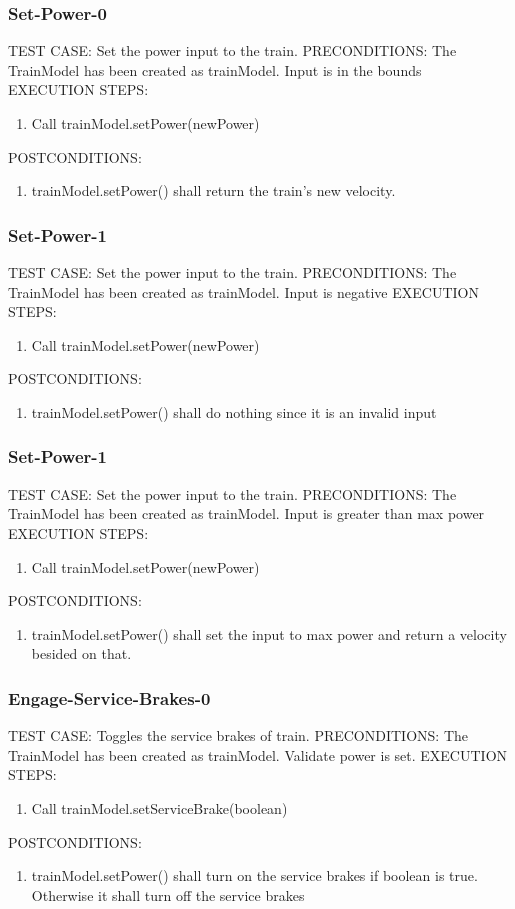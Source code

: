 \documentclass{scrreprt}
\begin{document}
\subsubsection{Set-Power-0}
TEST CASE: Set the power input to the train.
PRECONDITIONS: The TrainModel has been created as trainModel. Input is in the bounds
EXECUTION STEPS:
\begin{enumerate}
	\item Call trainModel.setPower(newPower)
\end{enumerate}
POSTCONDITIONS:
\begin{enumerate}
	\item trainModel.setPower() shall return the train's new velocity.
\end{enumerate}

\subsubsection{Set-Power-1}
TEST CASE: Set the power input to the train.
PRECONDITIONS: The TrainModel has been created as trainModel. Input is negative
EXECUTION STEPS:
\begin{enumerate}
	\item Call trainModel.setPower(newPower)
\end{enumerate}
POSTCONDITIONS:
\begin{enumerate}
	\item trainModel.setPower() shall do nothing since it is an invalid input
\end{enumerate}

\subsubsection{Set-Power-1}
TEST CASE: Set the power input to the train.
PRECONDITIONS: The TrainModel has been created as trainModel. Input is greater than max power
EXECUTION STEPS:
\begin{enumerate}
	\item Call trainModel.setPower(newPower)
\end{enumerate}
POSTCONDITIONS:
\begin{enumerate}
	\item trainModel.setPower() shall set the input to max power and return a velocity besided on that.
\end{enumerate}

\subsubsection{Engage-Service-Brakes-0}
TEST CASE: Toggles the service brakes of train.
PRECONDITIONS: The TrainModel has been created as trainModel. Validate power is set.
EXECUTION STEPS:
\begin{enumerate}
	\item Call trainModel.setServiceBrake(boolean)
\end{enumerate}
POSTCONDITIONS:
\begin{enumerate}
	\item trainModel.setPower() shall turn on the service brakes if boolean is true. Otherwise it shall turn off the service brakes
\end{enumerate}
\end{document}
